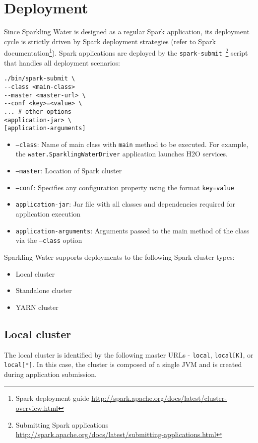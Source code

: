 \section{Deployment}
Since Sparkling Water is designed as a regular Spark application, its deployment cycle is strictly driven by Spark deployment strategies (refer to Spark documentation\footnote{Spark deployment guide \url{http://spark.apache.org/docs/latest/cluster-overview.html}}). Spark applications are deployed by the \texttt{spark-submit}~\footnote{Submitting Spark applications \url{http://spark.apache.org/docs/latest/submitting-applications.html}} script that handles all deployment scenarios:

\begin{lstlisting}[style=Bash]
./bin/spark-submit \
--class <main-class>
--master <master-url> \
--conf <key>=<value> \
... # other options
<application-jar> \
[application-arguments]
\end{lstlisting}

\begin{itemize}
	\item \texttt{--class}: Name of main class with \texttt{main} method to be executed. For example, the \texttt{water.SparklingWaterDriver} application launches H2O services.
	\item \texttt{--master}: Location of Spark cluster
	\item \texttt{--conf}: Specifies any configuration property using the format \texttt{key=value}
	\item \texttt{application-jar}: Jar file with all classes and dependencies required for application execution
	\item \texttt{application-arguments}: Arguments passed to the main method of the class via the \texttt{--class} option
\end{itemize}


Sparkling Water supports deployments to the following Spark cluster types:
\begin{itemize}
	\item{Local cluster}
	\item{Standalone cluster} 
	\item{YARN cluster}
\end{itemize}

\subsection{Local cluster}
The local cluster is identified by the following master URLs - \texttt{local}, \texttt{local[K]}, or \texttt{local[*]}. In this case, the cluster is composed of a single JVM and is created during application submission.

